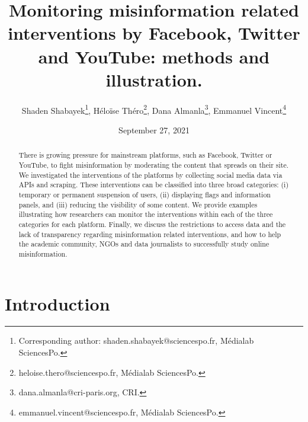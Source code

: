 \documentclass{article}
\begin{document}
\title{Monitoring misinformation related interventions by Facebook, Twitter and YouTube: methods and illustration.}
\author{Shaden Shabayek\footnote{Corresponding author: shaden.shabayek@sciencespo.fr, M\'{e}dialab SciencesPo.}, H\'{e}lo\"{i}se Th\'{e}ro\footnote{heloise.thero@sciencespo.fr, M\'{e}dialab SciencesPo.}, Dana Almanla\footnote{dana.almanla@cri-paris.org, CRI.}, Emmanuel Vincent\footnote{emmanuel.vincent@sciencespo.fr, M\'{e}dialab SciencesPo.}}
\date{September 27, 2021}
\maketitle







\begin{abstract}

There is growing pressure for mainstream platforms, such as Facebook, Twitter or YouTube, to fight misinformation by moderating the content that spreads on their site. We investigated the interventions of the platforms by collecting social media data via APIs and scraping. These interventions can be classified into three broad categories: (i) temporary or permanent suspension of users, (ii) displaying flags and information panels, and (iii) reducing the visibility of some content. We provide examples illustrating how researchers can monitor the interventions within each of the three categories for each platform. Finally, we discuss the restrictions to access data and the lack of transparency regarding misinformation related interventions, and how to help the academic community, NGOs and data journalists to successfully study online misinformation. 
\end{abstract}

\section{Introduction}
\end{document}
